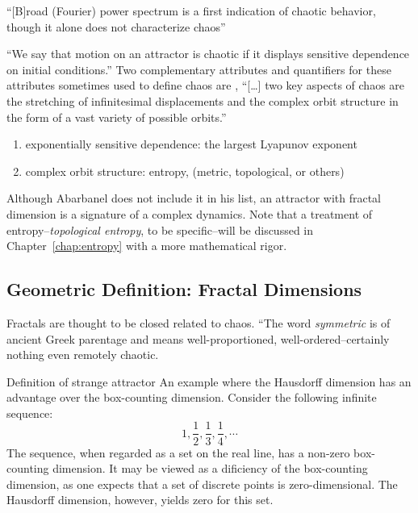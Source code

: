 \documentclass[12pt,twoside]{book}
\begin{document}
``[B]road (Fourier) power spectrum is a first indication of chaotic behavior, though it alone does not characterize chaos''\citep[p.1338]{abarbanel}

``We say that motion on an attractor is chaotic if it displays sensitive dependence on initial conditions.'' \citep[p.11]{ott1994}
Two complementary attributes and quantifiers for these attributes sometimes used to define chaos are \citep[p.379]{abarbanel}, %
``[\ldots] two key aspects of chaos are the stretching of infinitesimal displacements and the complex orbit structure in the form of a vast variety of possible orbits.'' \citep[p.31]{ott1994}
\begin{enumerate}
  \item exponentially sensitive dependence: the largest Lyapunov exponent 
  \item complex orbit structure: entropy, (metric, topological, or others)
\end{enumerate}

Although Abarbanel does not include it in his list, an attractor with fractal dimension is a signature of a complex dynamics.
Note that a treatment of entropy--\textit{topological entropy}, to be specific--will be discussed in Chapter~\ref{chap:entropy} with a more mathematical rigor.

\subsection*{Geometric Definition: Fractal Dimensions}
Fractals are thought to be closed related to chaos.
\citet{schroeder} 
``The word \textit{symmetric} is of ancient Greek parentage and means well-proportioned, well-ordered--certainly nothing even remotely chaotic.

Definition of strange attractor\citep[p.131]{ruelle}
An example where the Hausdorff dimension has an advantage over the box-counting dimension.
Consider the following infinite sequence:
\begin{equation*}
  1, \frac{1}{2}, \frac{1}{3}, \frac{1}{4}, \cdots
\end{equation*}
The sequence, when regarded as a set on the real line, has a non-zero box-counting dimension.
It may be viewed as a dificiency of the box-counting dimension, as one expects that
a set of discrete points is zero-dimensional.
The Hausdorff dimension, however, yields zero for this set.
\end{document}
